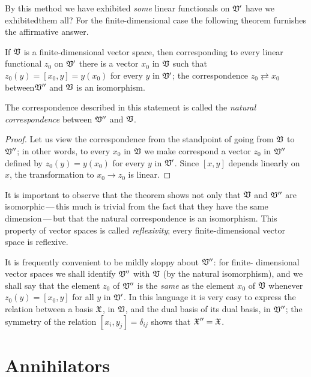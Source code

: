By this method we have exhibited \emph{some} linear functionals on \(\mathfrak{V}'\)
have we exhibitedthem all? For the finite-dimensional case the following theorem
furnishes the affirmative answer.

\begin{thmx}
    If \(\mathfrak{V}\) is a finite-dimensional vector space, then corresponding to
    every linear functional \(z_0\) on \(\mathfrak{V}'\) there is a vector \(x_0\) in
    \(\mathfrak{V}\) such that \(z_0(y) = [x_0, y]= y(x_0)\) for every \(y\) in
    \(\mathfrak{V}'\); the correspondence \(z_0 \rightleftarrows x_0\) between\(\mathfrak{V}''\)
    and \(\mathfrak{V}\) is an isomorphism.
\end{thmx}

The correspondence described in this statement is called the \emph{natural
correspondence} between \(\mathfrak{V}''\) and \(\mathfrak{V}\).

\begin{proof}
    Let us view the correspondence from the standpoint of going from \(\mathfrak{V}\)
    to \(\mathfrak{V}''\); in other words, to every \(x_0\) in \(\mathfrak{V}\) we make
    correspond a vector \(z_0\) in \(\mathfrak{V}''\) defined by \(z_0(y) = y(x_0)\) for
    every \(y\) in \(\mathfrak{V}'\). Since \([x, y]\) depends linearly on \(x\), the
    transformation to \(x_0 \to z_0\) is linear.
\end{proof}

It is important to observe that the theorem shows not only that \(\mathfrak{V}\) and
\(\mathfrak{V}''\) are isomorphic\,---\,this much is trivial from the fact that they
have the same dimension\,---\,but that the natural correspondence is an
isomorphism. This property of vector spaces is called \emph{reflexivity}; every
finite-dimensional vector space is reflexive.

It is frequently convenient to be mildly sloppy about \(\mathfrak{V}''\): for finite-
dimensional vector spaces we shall identify \(\mathfrak{V}''\) with \(\mathfrak{V}\) (by the
natural isomorphism), and we shall say that the element \(z_0\) of \(\mathfrak{V}''\) is
the \emph{same} as the element \(x_0\) of \(\mathfrak{V}\) whenever \(z_0(y) = [x_0,
y]\) for all \(y\) in \(\mathfrak{V}'\). In this language it is very easy to express the
relation between a basis \(\mathfrak{X}\), in \(\mathfrak{V}\), and the dual basis of its
dual basis, in \(\mathfrak{V}''\); the symmetry of the relation \([x_i, y_j] =
\delta_{ij}\) shows that \(\mathfrak{X}'' = \mathfrak{X}\).

\section{Annihilators}

